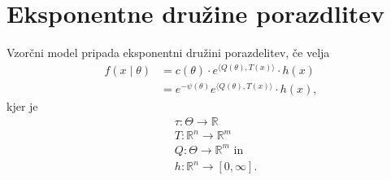 \documentclass[a4paper, 12pt]{book}
\theoremstyle{definition}
\theoremstyle{remark}
\newcommand{\R}{\mathbb{R}}
\begin{document}
\section{Eksponentne družine porazdlitev}

Vzorčni model pripada eksponentni družini porazdelitev, če velja
\begin{align}
  f(x \mid \theta) &= c(\theta) \cdot e^{\langle Q(\theta), T(x)\rangle} \cdot h(x) \nonumber \\
  &= e^{-\psi(\theta)} e^{\langle Q(\theta), T(x)\rangle} \cdot h(x), \label{eksponentna-osnova}
\end{align}
kjer je
\begin{align*}
  &\tau: \Theta \to \R \\
  &T: \R^n \to \R^m \\
  &Q: \Theta \to \R^m \text{ in} \\
  &h: \R^n \to [0, \infty].
\end{align*}
\end{document}
